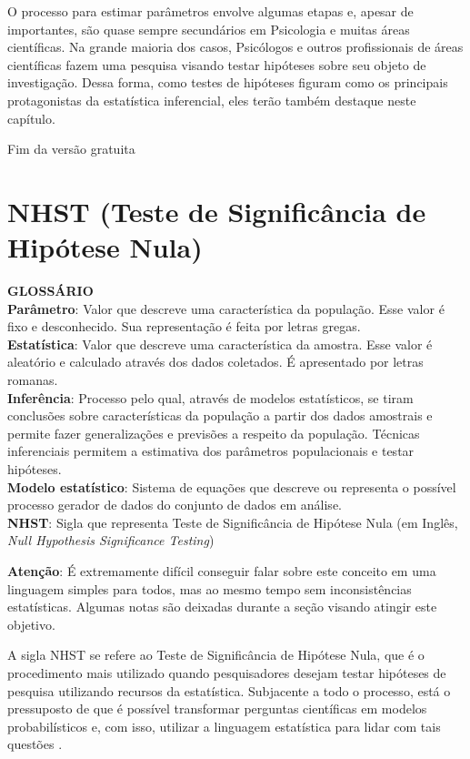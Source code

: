 \documentclass[
]{book}
\begin{document}
O processo para estimar parâmetros envolve algumas etapas e, apesar de importantes, são quase sempre secundários em Psicologia e muitas áreas científicas. Na grande maioria dos casos, Psicólogos e outros profissionais de áreas científicas fazem uma pesquisa visando testar hipóteses sobre seu objeto de investigação. Dessa forma, como testes de hipóteses figuram como os principais protagonistas da estatística inferencial, eles terão também destaque neste capítulo.

Fim da versão gratuita

\hypertarget{nhst-teste-de-significuxe2ncia-de-hipuxf3tese-nula}{%
\section{NHST (Teste de Significância de Hipótese Nula)}\label{nhst-teste-de-significuxe2ncia-de-hipuxf3tese-nula}}

\textbf{GLOSSÁRIO}\\
\textbf{Parâmetro}: Valor que descreve uma característica da população. Esse valor é fixo e desconhecido. Sua representação é feita por letras gregas.\\
\textbf{Estatística}: Valor que descreve uma característica da amostra. Esse valor é aleatório e calculado através dos dados coletados. É apresentado por letras romanas.\\
\textbf{Inferência}: Processo pelo qual, através de modelos estatísticos, se tiram conclusões sobre características da população a partir dos dados amostrais e permite fazer generalizações e previsões a respeito da população. Técnicas inferenciais permitem a estimativa dos parâmetros populacionais e testar hipóteses.\\
\textbf{Modelo estatístico}: Sistema de equações que descreve ou representa o possível processo gerador de dados do conjunto de dados em análise.\\
\textbf{NHST}: Sigla que representa Teste de Significância de Hipótese Nula (em Inglês, \emph{Null Hypothesis Significance Testing})

\textbf{Atenção}: É extremamente difícil conseguir falar sobre este conceito em uma linguagem simples para todos, mas ao mesmo tempo sem inconsistências estatísticas. Algumas notas são deixadas durante a seção visando atingir este objetivo.

A sigla NHST se refere ao Teste de Significância de Hipótese Nula, que é o procedimento mais utilizado quando pesquisadores desejam testar hipóteses de pesquisa utilizando recursos da estatística. Subjacente a todo o processo, está o pressuposto de que é possível transformar perguntas científicas em modelos probabilísticos e, com isso, utilizar a linguagem estatística para lidar com tais questões \citep{Curley013}.
\end{document}
